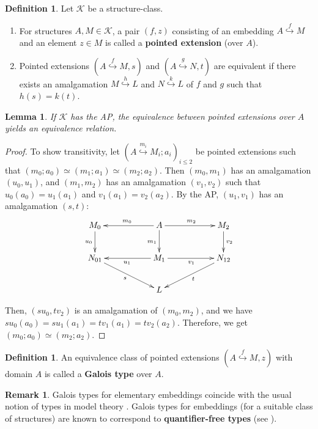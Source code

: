 \documentclass[10pt]{amsart}
\numberwithin{equation}{section}
\theoremstyle{plain}
\newtheorem{lemma}[theorem]{Lemma}
\theoremstyle{definition}
\newtheorem{definition}[theorem]{Definition}
\newtheorem*{remark}{Remark}
\newcommand{\K}{\mathcal{K}}
\newcommand{\itt}[1]{\textsl{#1}}
\newcommand{\embed}{\hookrightarrow}
\newcommand{\embedge}[1]{\overset{#1}{\embed}}
\begin{document}
\begin{definition}
Let $\mathcal{K}$ be a structure-class.
\begin{enumerate}
\item For structures $A,M\in\mathcal{K}$, a pair $(f,z)$ consisting of an embedding $A\embedge{f}M$ and an element $z\in M$ is called a {\bf pointed extension} (over $A$).
\item Pointed extensions $(A\embedge{f}M,s)$ and $(A\embedge{g}N,t)$ are equivalent if there exists an amalgamation $M\embedge{h}L$ and $N\embedge{k}L$ of $f$ and $g$ such that $h(s)=k(t)$.
\end{enumerate}
\end{definition}


\begin{lemma}
If $\K$ has the AP, the equivalence between pointed extensions over $A$ yields an equivalence relation.
\end{lemma}

\begin{proof}
To show transitivity, let $(A\embedge{m_i}M_i;a_i)_{i\leq 2}$ be pointed extensions such that $(m_0;a_0)\simeq(m_1;a_1)\simeq(m_2;a_2)$.
Then $(m_0,m_1)$ has an amalgamation $(u_0,u_1)$, and $(m_1,m_2)$ has an amalgamation $(v_1,v_2)$ such that $u_0(a_0)=u_1(a_1)$ and $v_1(a_1)=v_2(a_2)$.
By the AP, $(u_1,v_1)$ has an amalgamation $(s,t)$:
\begin{align*}
\xymatrix{
	M_0 \ar[d]_{u_0} & & A \ar[rr]^{m_2} \ar[ll]_{m_0} \ar[d]_{m_1} & & M_2 \ar[d]^{v_2}\\
	N_{01} \ar[rrd]_{s} & & M_1 \ar[rr]_{v_1} \ar[ll]^{u_1} & & N_{12} \ar[lld]^{t}\\
	& & L & &
}
\end{align*}

Then, $(su_0,tv_2)$ is an amalgamation of $(m_0,m_2)$, and we have  $su_0(a_0)=su_1(a_1)=tv_1(a_1)=tv_2(a_2)$.
Therefore, we get $(m_0;a_0)\simeq(m_2;a_2)$.
\end{proof}

\begin{definition}
An equivalence class of pointed extensions $(A\embedge{f}M,z)$ with domain $A$ is called a {\bf Galois type} over $A$.
\end{definition}

\begin{remark}
Galois types for elementary embeddings coincide with the usual notion of types in model theory \cite[Chapter 8]{Bal09}.
Galois types for embeddings (for a suitable class of structures) are known to correspond to {\bf quantifier-free types} (see \cite[Remark 3.8]{Vas17}).
\end{remark}
\end{document}
